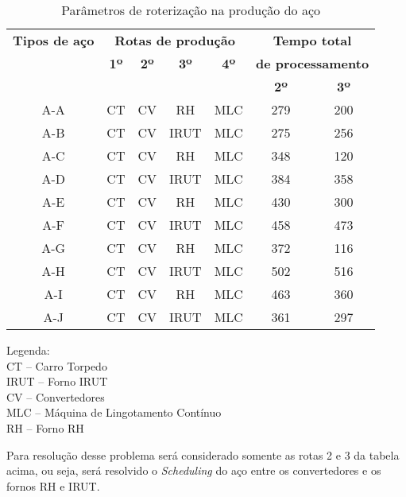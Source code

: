 \begin{table}[H]
\begin{center}
\begin{tabular}{|c|c|c|c|c|c|c|}
\hline
\multicolumn{ 1}{|c|}{\textbf{Tipos de aço}} & \multicolumn{ 4}{c|}{\textbf{Rotas de produção}} & \multicolumn{ 2}{c|}{\textbf{Tempo total }} \\ \cline{ 2- 7}
\multicolumn{ 1}{|c|}{} & \multicolumn{ 1}{c|}{\textbf{1º}} & \multicolumn{ 1}{c|}{\textbf{2º}} & \multicolumn{ 1}{c|}{\textbf{3º}} & \multicolumn{ 1}{c|}{\textbf{4º}} & \multicolumn{ 2}{c|}{\textbf{de processamento }} \\ \cline{ 6- 7}
\multicolumn{ 1}{|c|}{} & \multicolumn{ 1}{c|}{} & \multicolumn{ 1}{c|}{} & \multicolumn{ 1}{c|}{} & \multicolumn{ 1}{c|}{} & \textbf{2º} & \textbf{3º} \\ \hline
A-A & CT & CV & RH & MLC & 279 & 200 \\ \hline
A-B & CT & CV & IRUT & MLC & 275 & 256 \\ \hline
A-C & CT & CV & RH & MLC & 348 & 120 \\ \hline
A-D & CT & CV & IRUT & MLC & 384 & 358 \\ \hline
A-E & CT & CV & RH & MLC & 430 & 300 \\ \hline
A-F & CT & CV & IRUT & MLC & 458 & 473 \\ \hline
A-G & CT & CV & RH & MLC & 372 & 116 \\ \hline
A-H & CT & CV & IRUT & MLC & 502 & 516 \\ \hline
A-I & CT & CV & RH & MLC & 463 & 360 \\ \hline
A-J & CT & CV & IRUT & MLC & 361 & 297 \\ \hline
\end{tabular}
\end{center}
\caption{Parâmetros de roterização na produção do aço}
\label{desc_rota}
\end{table}
Legenda:\\
CT – Carro Torpedo \\
IRUT – Forno IRUT \\				
CV – Convertedores \\		
MLC – Máquina de Lingotamento Contínuo \\				
RH – Forno RH						

Para resolução desse problema será considerado somente as rotas 2 e 3 da tabela acima, ou seja, será resolvido o {\it Scheduling} do aço entre os convertedores e os fornos RH e IRUT.







